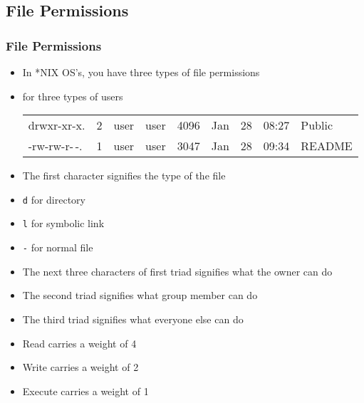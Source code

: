 \documentclass[slidestop,mathserif,compress,xcolor=svgnames]{beamer}
\newenvironment{eblock}[0]
{
\begin{beamerboxesrounded}[upper=uppercol2,lower=lowercol2,shadow=true]}
{\end{beamerboxesrounded}}
\begin{document}
\subsection{File Permissions}
\begin{frame}
  \frametitle{\small File Permissions}
  \begin{itemize}
    \item In *NIX OS's, you have three types of file permissions
    \item for three types of users
    \begin{eblock}{}
      \begin{tabular}{lllllllll}
        drwxr-xr-x. & 2 & user & user & 4096 & Jan & 28 & 08:27 & Public\\
        -rw-rw-r-\,-. & 1 & user & user & 3047 & Jan & 28 & 09:34 & README\\
      \end{tabular}
    \end{eblock}
    \item The first character signifies the type of the file
    \item[] \texttt{d} for directory
    \item[] \texttt{l} for symbolic link
    \item[] \texttt{-} for normal file
    \item The next three characters of first triad signifies what the owner can do
    \item The second triad signifies what group member can do
    \item The third triad signifies what everyone else can do
    \item Read carries a weight of 4
    \item Write carries a weight of 2
    \item Execute carries a weight of 1

\end{itemize}
\end{frame}
\end{document}
